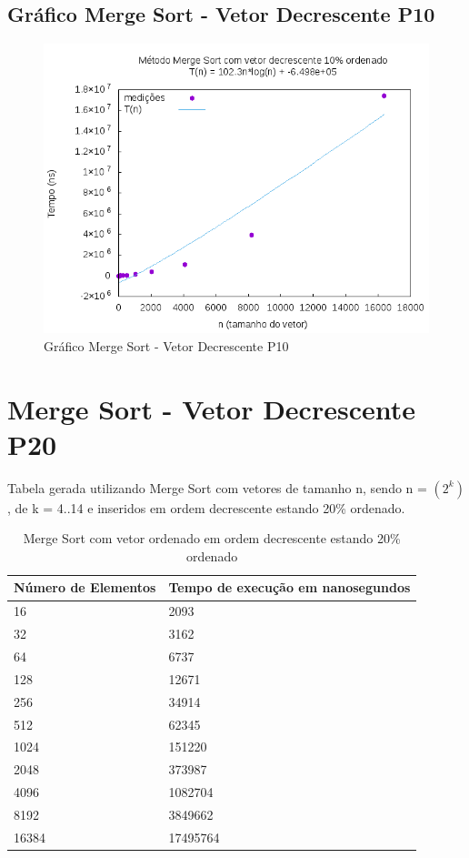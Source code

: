 \documentclass[12pt,a4paper,twoside]{report}
\begin{document}
\subsection{Gráfico Merge Sort - Vetor Decrescente P10}
\begin{figure}[H]
    \centering
    \includegraphics[width=0.7\linewidth]{graficos/MergeSort/vIntDecrescenteP10/vIntDecrescenteP10.png}
  \caption{Gráfico Merge Sort - Vetor Decrescente P10}
\end{figure}

\section{Merge Sort - Vetor Decrescente P20}
Tabela gerada utilizando Merge Sort com vetores de tamanho n, sendo n = $(2^k)$, de k = 4..14 e inseridos em ordem decrescente estando 20\% ordenado.
\begin{table}[H]
\centering
\caption{Merge Sort com vetor ordenado em ordem decrescente estando 20\% ordenado}
\label{my-label}
\begin{tabular}{|l|l|}
\hline
\multicolumn{1}{|c|}{\textbf{Número de Elementos}} & \multicolumn{1}{c|}{\textbf{Tempo de execução em nanosegundos}} \\ \hline
16 & 2093 \\ \hline
32 & 3162 \\ \hline
64 & 6737 \\ \hline
128 & 12671 \\ \hline
256 & 34914 \\ \hline
512 & 62345 \\ \hline
1024 & 151220 \\ \hline
2048 & 373987 \\ \hline
4096 & 1082704 \\ \hline
8192 & 3849662 \\ \hline
16384 & 17495764 \\ \hline
\end{tabular}
\end{table}
\end{document}
